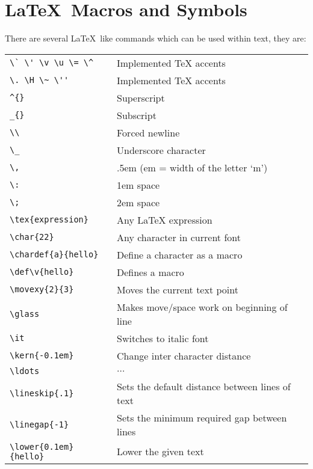 \newpage
\section{\LaTeX\ Macros and Symbols}
\label{ltxsym:sec}

\index{\LaTeX} There are several \LaTeX\ like commands 
which can be used within text, they are:

\vspace{0.5cm}
\begin{tabular}{ll}
\verb+\` \' \v \u \= \^+    & Implemented TeX accents \\
\verb+\. \H \~ \''+         & Implemented TeX accents \\
\verb+^{}+                  & Superscript \\
\verb+_{}+                  & Subscript \\
\verb+\\+                   & Forced newline \\
\verb+\_+                   & Underscore character \\
\verb+\,+                   & .5em (em = width of the letter `m') \\
\verb+\:+                   & 1em space \\
\verb+\;+                   & 2em space \\
\verb+\tex{expression}+     & Any LaTeX expression \\
\verb+\char{22}+            & Any character in current font \\
\verb+\chardef{a}{hello}+   & Define a character as a macro \\
\verb+\def\v{hello}+        & Defines a macro \\
\verb+\movexy{2}{3}+        & Moves the current text point \\
\verb+\glass+               & Makes move/space work on beginning of line \\
\verb+\it+                  & Switches to italic font \\ 
\verb+\kern{-0.1em}+        & Change inter character distance \\
\verb+\ldots+               & $\ldots$ \\
\verb+\lineskip{.1}+        & Sets the default distance between lines of text \\
\verb+\linegap{-1}+         & Sets the minimum required gap between lines \\
\verb+\lower{0.1em}{hello}+ & Lower the given text \\

\end{tabular}
